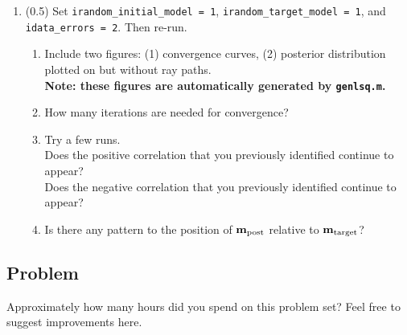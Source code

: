 \documentclass[11pt,titlepage,fleqn]{article}
\begin{document}
\begin{enumerate}

\item (0.5) Set \verb+irandom_initial_model = 1+, \verb+irandom_target_model = 1+, and \verb+idata_errors = 2+. Then re-run.
%
\begin{enumerate}
\item Include two figures: (1) convergence curves, (2) posterior distribution plotted on  but without ray paths. \\
{\bf Note: these figures are automatically generated by \verb+genlsq.m+.}
\item How many iterations are needed for convergence?
\item Try a few runs. \\
Does the positive correlation that you previously identified continue to appear? \\
Does the negative correlation that you previously identified continue to appear?
\item Is there any pattern to the position of $\mbox{${\bf m}$}_{\rm post}$ relative to $\mbox{${\bf m}$}_{\rm target}$?
\end{enumerate}

\end{enumerate}


\subsection*{Problem}

Approximately how many hours did you spend on this problem set? Feel free to suggest improvements here.




\end{document}
